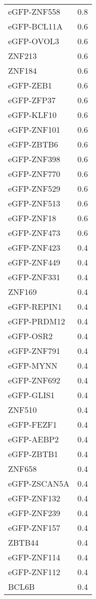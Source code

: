 \begin{longtable}{lr}
  eGFP-ZNF558 &    0.8 \\
  eGFP-BCL11A &    0.6 \\
   eGFP-OVOL3 &    0.6 \\
       ZNF213 &    0.6 \\
       ZNF184 &    0.6 \\
    eGFP-ZEB1 &    0.6 \\
   eGFP-ZFP37 &    0.6 \\
   eGFP-KLF10 &    0.6 \\
  eGFP-ZNF101 &    0.6 \\
   eGFP-ZBTB6 &    0.6 \\
  eGFP-ZNF398 &    0.6 \\
  eGFP-ZNF770 &    0.6 \\
  eGFP-ZNF529 &    0.6 \\
  eGFP-ZNF513 &    0.6 \\
   eGFP-ZNF18 &    0.6 \\
  eGFP-ZNF473 &    0.6 \\
  eGFP-ZNF423 &    0.4 \\
  eGFP-ZNF449 &    0.4 \\
  eGFP-ZNF331 &    0.4 \\
       ZNF169 &    0.4 \\
  eGFP-REPIN1 &    0.4 \\
  eGFP-PRDM12 &    0.4 \\
    eGFP-OSR2 &    0.4 \\
  eGFP-ZNF791 &    0.4 \\
    eGFP-MYNN &    0.4 \\
  eGFP-ZNF692 &    0.4 \\
   eGFP-GLIS1 &    0.4 \\
       ZNF510 &    0.4 \\
   eGFP-FEZF1 &    0.4 \\
   eGFP-AEBP2 &    0.4 \\
   eGFP-ZBTB1 &    0.4 \\
       ZNF658 &    0.4 \\
 eGFP-ZSCAN5A &    0.4 \\
  eGFP-ZNF132 &    0.4 \\
  eGFP-ZNF239 &    0.4 \\
  eGFP-ZNF157 &    0.4 \\
       ZBTB44 &    0.4 \\
  eGFP-ZNF114 &    0.4 \\
  eGFP-ZNF112 &    0.4 \\
        BCL6B &    0.4 \\

\end{longtable}

